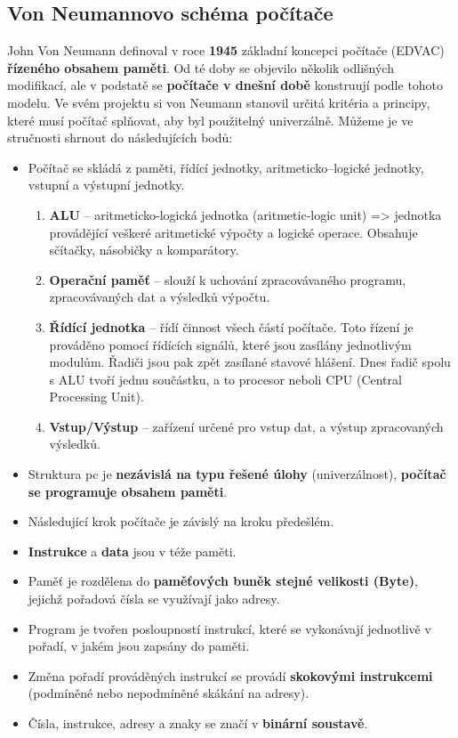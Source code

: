 \subsection{Von Neumannovo schéma počítače}

John Von Neumann definoval v roce \textbf{1945} základní koncepci počítače (EDVAC) \textbf{řízeného obsahem paměti}. Od té doby se objevilo několik odlišných modifikací, ale v podstatě se \textbf{počítače v dnešní době} konstruují podle tohoto modelu. Ve svém projektu si von Neumann stanovil určitá kritéria a principy, které musí počítač splňovat, aby byl použitelný univerzálně. Můžeme je ve stručnosti shrnout do následujících bodů:
\begin{itemize}
\item Počítač se skládá z paměti, řídící jednotky, aritmeticko--logické jednotky, vstupní a  výstupní jednotky.
\begin{enumerate}
\item \textbf{ALU} -- aritmeticko-logická jednotka (aritmetic-logic unit) => jednotka provádějící veškeré aritmetické výpočty a logické operace. Obsahuje sčítačky, násobičky a komparátory.
\item  \textbf{Operační paměť} -- slouží k uchování zpracovávaného programu, zpracovávaných dat a výsledků výpočtu.
\item \textbf{Řídící jednotka} -- řídí činnost všech částí počítače. Toto řízení je prováděno pomocí řídících signálů, které jsou zasílány jednotlivým modulům. Řadiči jsou pak zpět zasílané stavové hlášení. Dnes řadič spolu s ALU tvoří jednu součástku, a to procesor neboli CPU (Central Processing Unit).
\item \textbf{Vstup/Výstup} -- zařízení určené pro vstup dat, a výstup zpracovaných výsledků.
\end{enumerate}
\item Struktura pc je \textbf{nezávislá na typu řešené úlohy} (univerzálnost), \textbf{počítač se programuje obsahem paměti}.
\item Následující krok počítače je závislý na kroku předešlém.
\item \textbf{Instrukce} a \textbf{data} jsou v téže paměti.
\item Paměť je rozdělena do \textbf{paměťových buněk stejné velikosti (Byte)}, jejichž pořadová čísla se využívají jako adresy.
\item Program je tvořen posloupností instrukcí, které se vykonávají jednotlivě v pořadí, v jakém jsou zapsány do paměti.
\item Změna pořadí prováděných instrukcí se provádí \textbf{skokovými instrukcemi} (podmíněné nebo nepodmíněné skákání na adresy). 
\item Čísla, instrukce, adresy a znaky se značí v \textbf{binární soustavě}.
\end{itemize}
